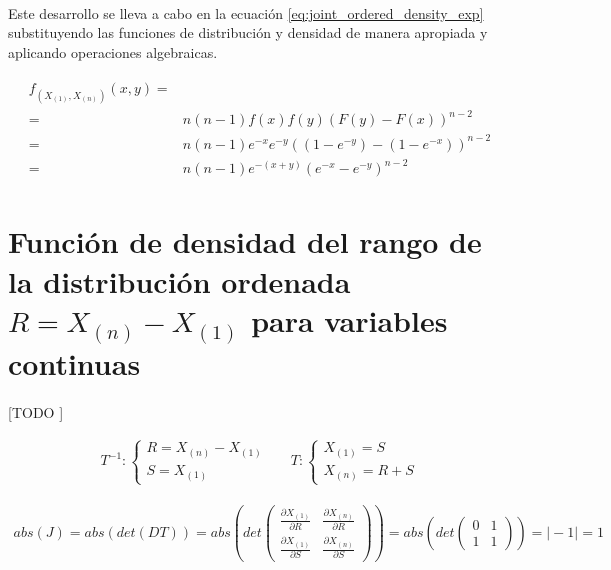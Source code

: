 \documentclass{article}
\begin{document}
      \paragraph{}
      Este desarrollo se lleva a cabo en la ecuación \eqref{eq:joint_ordered_density_exp} substituyendo las funciones de distribución y densidad de manera apropiada y aplicando operaciones algebraicas.

      \begin{align}
        \label{eq:joint_ordered_density_exp}
        \begin{split}
          f_{(X_{(1)}, X_{(n)})} (x,y) =& \\
          =& n(n-1)f(x)f(y)(F(y) - F(x))^{n-2} \\
          =& n  (n-1) e^{-x} e^{-y} ( (1 - e^{-y}) - (1 - e^{-x}) )^{n-2} \\
          =& n  (n-1) e^{-(x+y)} ( e^{-x} - e^{-y} )^{n-2}
        \end{split}
      \end{align}

  \section{Función de densidad del rango de la distribución ordenada $R = X_{(n)} - X_{(1)}$ para variables continuas}
  \label{sec:e2}

    \paragraph{}
    [TODO ]

    \begin{align}
      T^{-1}:
      \begin{cases}
        R = X_{(n)} - X_{(1)} \\
        S = X_{(1)}
      \end{cases} &&
      T:
      \begin{cases}
        X_{(1)} = S \\
        X_{(n)} = R + S
      \end{cases}
    \end{align}

    \begin{align}
      abs(J) =  abs(det(DT)) = abs\left(det\left( \begin{array}{cc}
\frac{\partial X_{(1)}}{ \partial R} & \frac{\partial X_{(n)}}{ \partial R}  \\
\frac{\partial X_{(1)}}{ \partial S} & \frac{\partial X_{(n)}}{ \partial S} \end{array} \right) \right) = abs\left(det\left( \begin{array}{cc}
0 & 1  \\
1 & 1 \end{array} \right) \right)  = \mid -1\mid = 1
    \end{align}
\end{document}

